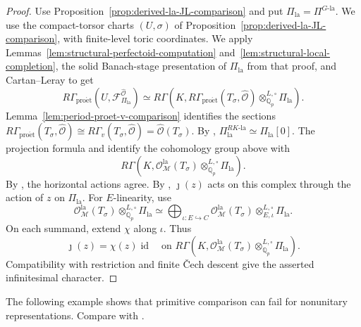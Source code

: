 \documentclass[11pt]{article}
\theoremstyle{definition}
\newcommand{\Qp}{\mathbb Q_p}
\newcommand{\cM}{\mathcal M}
\newcommand{\cF}{\mathcal F}
\newcommand{\la}{\mathrm{la}}
\newcommand{\proet}{\mathrm{pro\acute et}}
\begin{document}
\begin{proof}
Use Proposition~\ref{prop:derived-la-JL-comparison} and put
\(\Pi_{\la}=\Pi^{G\text{-}\la}\).
We use the compact-torsor charts \((U,\sigma)\) of
Proposition~\ref{prop:derived-la-JL-comparison}, with finite-level toric coordinates.
We apply Lemmas~\ref{lem:structural-perfectoid-computation}
and~\ref{lem:structural-local-completion}, the solid Banach-stage
presentation of \(\Pi_{\la}\) from that proof, and Cartan--Leray to get
\begin{equation*}
 R\Gamma_{\proet}(U,\cF_{\Pi_{\la}}^{\widehat{\mathscr O}})
 \simeq R\Gamma\left(K,
 R\Gamma_{\proet}(T_\sigma,\widehat{\mathscr O})
                    \otimes_{\Qp}^{L,\square}\Pi_{\la}\right).
\end{equation*}
Lemma~\ref{lem:period-proet-v-comparison} identifies the sections 
\(R\Gamma_{\proet}(T_\sigma,\widehat{\mathscr O})\cong R\Gamma_v(T_\sigma,\widehat{\mathscr O})=\widehat{\mathscr{O}}(T_\sigma)\).
By \cite[Proposition~3.2.9]{RJRCSolid},
\(\Pi_{\la}^{RK\text{-}\la}\simeq \Pi_{\la}[0]\).  The projection formula and
\cite[Theorems~6.1.1 and~6.2.1]{DRC} identify the cohomology group above with
\begin{equation*}
 R\Gamma\left(K,
 \mathscr O^{\la}_{\cM}(T_\sigma)
                         \otimes_{\Qp}^{L,\square}\Pi_{\la}\right).
\end{equation*}
By \cite[Theorem~6.3.1]{DRC}, the horizontal actions agree.
By \cite[proof of Theorem~7.2.2]{DRC}, \(\jmath(z)\) acts on
this complex through the action of \(z\) on \(\Pi_{\la}\).
For \(E\)-linearity, use
\begin{equation*}
 \mathscr O^{\la}_{\cM}(T_\sigma)
       \otimes_{\Qp}^{L,\square}\Pi_{\la}
 \simeq
 \bigoplus_{\iota:E\hookrightarrow C}
 \mathscr O^{\la}_{\cM}(T_\sigma)
       \otimes_{E,\iota}^{L,\square}\Pi_{\la}.
\end{equation*}
On each summand, extend \(\chi\) along \(\iota\).  Thus
\begin{equation*}
 \jmath(z)=\chi(z)\operatorname{id}
 \quad\text{on }
 R\Gamma\left(K,
 \mathscr O^{\la}_{\cM}(T_\sigma)
                         \otimes_{\Qp}^{L,\square}\Pi_{\la}\right).
\end{equation*}
Compatibility with restriction and finite \v Cech descent
give the asserted infinitesimal character.
\end{proof}

The following example shows that primitive comparison can fail
for nonunitary representations. Compare with \cite[Example~1.1.2]{ALM}.
\end{document}
